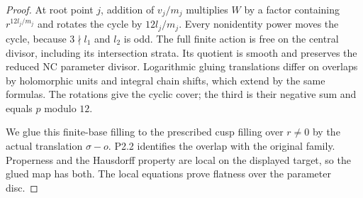 \begin{proof}
At root point $j$, addition of $v_j/m_j$ multiplies $W$ by a factor containing $r^{12l_j/m_j}$ and rotates the cycle by $12l_j/m_j$. Every nonidentity power moves the cycle, because $3\nmid l_1$ and $l_2$ is odd. The full finite action is free on the central divisor, including its intersection strata. Its quotient is smooth and preserves the reduced NC parameter divisor. Logarithmic gluing translations differ on overlaps by holomorphic units and integral chain shifts, which extend by the same formulas. The rotations give the cyclic cover; the third is their negative sum and equals $p$ modulo $12$.

We glue this finite-base filling to the prescribed cusp filling over $r\ne0$ by the actual translation $\sigma-o$. P2.2 identifies the overlap with the original family. Properness and the Hausdorff property are local on the displayed target, so the glued map has both. The local equations prove flatness over the parameter disc.
\end{proof}

